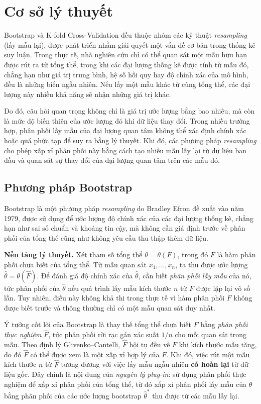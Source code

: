 \documentclass[14pt,a4paper]{extarticle}\usepackage[]{graphicx}\usepackage[]{xcolor}
\begin{document}
\section{Cơ sở lý thuyết}

Bootstrap và K-fold Cross-Validation đều thuộc nhóm các kỹ thuật
\emph{resampling} (lấy mẫu lại), được phát triển nhằm giải quyết một vấn đề
cơ bản trong thống kê suy luận. Trong thực tế, nhà nghiên cứu chỉ có thể quan
sát một mẫu hữu hạn được rút ra từ tổng thể, trong khi các đại lượng thống kê
được tính từ mẫu đó, chẳng hạn như giá trị trung bình, hệ số hồi quy hay độ
chính xác của mô hình, đều là những biến ngẫu nhiên. Nếu lấy một mẫu khác từ
cùng tổng thể, các đại lượng này nhiều khả năng sẽ nhận những giá trị khác.

Do đó, câu hỏi quan trọng không chỉ là giá trị ước lượng bằng bao nhiêu, mà
còn là mức độ biến thiên của ước lượng đó khi dữ liệu thay đổi. Trong nhiều
trường hợp, phân phối lấy mẫu của đại lượng quan tâm không thể xác định chính
xác hoặc quá phức tạp để suy ra bằng lý thuyết. Khi đó, các phương pháp
\emph{resampling} cho phép xấp xỉ phân phối này bằng cách tạo nhiều mẫu lấy
lại từ dữ liệu ban đầu và quan sát sự thay đổi của đại lượng quan tâm trên
các mẫu đó.

\subsection{Phương pháp Bootstrap}

Bootstrap là một phương pháp \emph{resampling} do Bradley Efron đề xuất vào
năm 1979, được sử dụng để ước lượng độ chính xác của các đại lượng thống kê,
chẳng hạn như sai số chuẩn và khoảng tin cậy, mà không cần giả định trước về
phân phối của tổng thể cũng như không yêu cầu thu thập thêm dữ liệu.

\textbf{Nền tảng lý thuyết.} Xét tham số tổng thể
$\theta = \theta(F)$, trong đó $F$ là hàm phân phối chưa biết của tổng thể.
Từ mẫu quan sát $x_1, \ldots, x_n$, ta thu được ước lượng
$\hat{\theta} = \theta(\hat{F})$. Để đánh giá độ chính xác của
$\hat{\theta}$, cần biết \emph{phân phối lấy mẫu} của nó, tức phân phối của
$\hat{\theta}$ nếu quá trình lấy mẫu kích thước $n$ từ $F$ được lặp lại vô
số lần. Tuy nhiên, điều này không khả thi trong thực tế vì hàm phân phối $F$
không được biết trước và thông thường chỉ có một mẫu quan sát duy nhất.

Ý tưởng cốt lõi của Bootstrap là thay thế tổng thể chưa biết $F$ bằng
\emph{phân phối thực nghiệm} $\hat{F}$, tức phân phối rời rạc gán xác suất
$1/n$ cho mỗi quan sát trong mẫu. Theo định lý Glivenko--Cantelli,
$\hat{F}$ hội tụ đều về $F$ khi kích thước mẫu tăng, do đó $\hat{F}$ có thể
được xem là một xấp xỉ hợp lý của $F$. Khi đó, việc rút một mẫu kích thước
$n$ từ $\hat{F}$ tương đương với việc lấy mẫu ngẫu nhiên \textbf{có hoàn
lại} từ dữ liệu gốc. Đây chính là nội dung của \emph{nguyên lý plug-in}: sử
dụng phân phối thực nghiệm để xấp xỉ phân phối của tổng thể, từ đó xấp xỉ
phân phối lấy mẫu của $\hat{\theta}$ bằng phân phối của các ước lượng
bootstrap $\hat{\theta}^{*}$ thu được từ các mẫu lấy lại.
\end{document}
